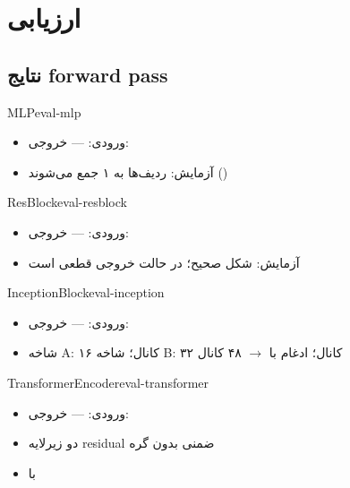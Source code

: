 \documentclass{nngraph-fa}
\begin{document}
\chapter{ارزیابی}



\section{نتایج forward pass}

\begin{exbox}{MLP}{eval-mlp}
\begin{itemize}[noitemsep]
    \item ورودی:  --- خروجی: 
    \item آزمایش:  ردیف‌ها به ۱ جمع می‌شوند
    ()
\end{itemize}
\end{exbox}

\begin{exbox}{ResBlock}{eval-resblock}
\begin{itemize}[noitemsep]
    \item ورودی:  --- خروجی: 
    \item آزمایش: شکل صحیح؛ در حالت  خروجی قطعی است
\end{itemize}
\end{exbox}

\begin{exbox}{InceptionBlock}{eval-inception}
\begin{itemize}[noitemsep]
    \item ورودی:  --- خروجی:
    \item شاخه A: ۱۶ کانال؛ شاخه B: ۳۲ کانال؛ ادغام با
     $\to$ ۴۸ کانال
\end{itemize}
\end{exbox}

\begin{exbox}{TransformerEncoder}{eval-transformer}
\begin{itemize}[noitemsep]
    \item ورودی:  --- خروجی: 
    \item دو زیرلایه residual ضمنی بدون گره 
    \item {} با 
\end{itemize}
\end{exbox}
\end{document}
